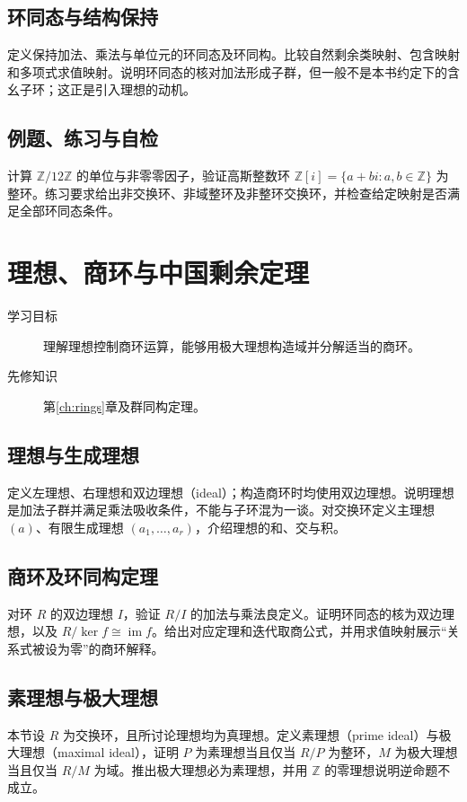 \documentclass[UTF8,12pt,a4paper,fontset=fandol]{ctexbook}
\begin{document}
\section{环同态与结构保持}
定义保持加法、乘法与单位元的环同态及环同构。比较自然剩余类映射、包含映射和多项式求值映射。说明环同态的核对加法形成子群，但一般不是本书约定下的含幺子环；这正是引入理想的动机。

\section{例题、练习与自检}
计算 $\mathbb Z/12\mathbb Z$ 的单位与非零零因子，验证高斯整数环 $\mathbb Z[i]=\{a+bi:a,b\in\mathbb Z\}$ 为整环。练习要求给出非交换环、非域整环及非整环交换环，并检查给定映射是否满足全部环同态条件。

\chapter{理想、商环与中国剩余定理}\label{ch:ideals}

\begin{description}
  \item[学习目标] 理解理想控制商环运算，能够用极大理想构造域并分解适当的商环。
  \item[先修知识] 第\ref{ch:rings}章及群同构定理。
\end{description}

\section{理想与生成理想}
定义左理想、右理想和双边理想（ideal）；构造商环时均使用双边理想。说明理想是加法子群并满足乘法吸收条件，不能与子环混为一谈。对交换环定义主理想 $(a)$、有限生成理想 $(a_1,\ldots,a_r)$，介绍理想的和、交与积。

\section{商环及环同构定理}
对环 $R$ 的双边理想 $I$，验证 $R/I$ 的加法与乘法良定义。证明环同态的核为双边理想，以及 $R/\ker f\cong\operatorname{im}f$。给出对应定理和迭代取商公式，并用求值映射展示“关系式被设为零”的商环解释。

\section{素理想与极大理想}
本节设 $R$ 为交换环，且所讨论理想均为真理想。定义素理想（prime ideal）与极大理想（maximal ideal），证明 $P$ 为素理想当且仅当 $R/P$ 为整环，$M$ 为极大理想当且仅当 $R/M$ 为域。推出极大理想必为素理想，并用 $\mathbb Z$ 的零理想说明逆命题不成立。
\end{document}
